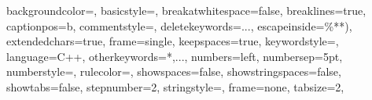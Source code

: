 \lstset
{
    backgroundcolor=\color{white},   %
    basicstyle=\tiny\ttfamily,       %
    breakatwhitespace=false,         %
    breaklines=true,                 %
    captionpos=b,                    %
    commentstyle=\color{mygreen},    %
    deletekeywords={...},            %
    escapeinside={\%*}{*)},          %
    extendedchars=true,              %
    frame=single,	                   %
    keepspaces=true,                 %
    keywordstyle=\color{blue},       %
    language=C++,                    %
    otherkeywords={*,...},           %
    numbers=left,                    %
    numbersep=5pt,                   %
    numberstyle=\tiny\color{mygray}, %
    rulecolor=\color{black},         %
    showspaces=false,                %
    showstringspaces=false,          %
    showtabs=false,                  %
    stepnumber=2,                    %
    stringstyle=\color{mymauve},     %
    frame=none,
    tabsize=2,	                   %
}
\newcommand\tikzwidth{2}
\newcommand\tikzwidthwide{4}
\newcommand\tikzheight{0.25}
\newcommand\tikzdec{0.9}

